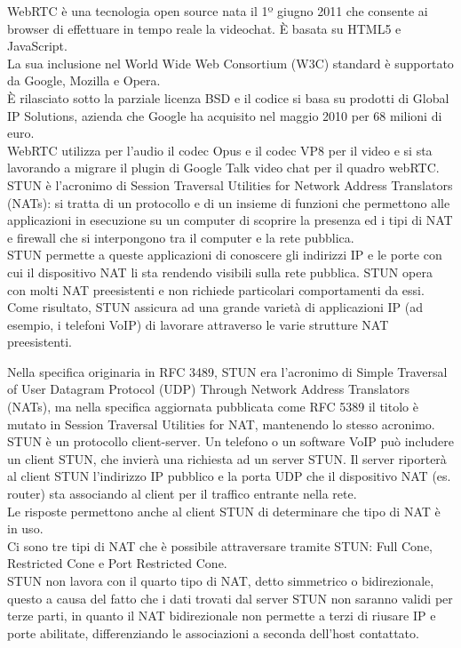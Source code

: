 ﻿\documentclass[11pt, a4paper, titlepage, block]{article}
\begin{document}
WebRTC è una tecnologia open source nata il 1º giugno 2011 che consente ai browser di effettuare in tempo reale la videochat. È basata su HTML5 e JavaScript.\\
La sua inclusione nel World Wide Web Consortium (W3C) standard è supportato da Google, Mozilla e Opera.\\
È rilasciato sotto la parziale licenza BSD e il codice si basa su prodotti di Global IP Solutions, azienda che Google ha acquisito nel maggio 2010 per 68 milioni di euro.\\
WebRTC utilizza per l'audio il codec Opus e il codec VP8 per il video e si sta lavorando a migrare il plugin di Google Talk video chat per il quadro webRTC.
\\
STUN è l'acronimo di Session Traversal Utilities for Network Address Translators (NATs): si tratta di un protocollo e di un insieme di funzioni che permettono alle applicazioni in esecuzione su un computer di scoprire la presenza ed i tipi di NAT e firewall che si interpongono tra il computer e la rete pubblica.\\
STUN permette a queste applicazioni di conoscere gli indirizzi IP e le porte con cui il dispositivo NAT li sta rendendo visibili sulla rete pubblica. STUN opera con molti NAT preesistenti e non richiede particolari comportamenti da essi.\\
Come risultato, STUN assicura ad una grande varietà di applicazioni IP (ad esempio, i telefoni VoIP) di lavorare attraverso le varie strutture NAT preesistenti.

Nella specifica originaria in RFC 3489, STUN era l'acronimo di Simple Traversal of User Datagram Protocol (UDP) Through Network Address Translators (NATs), ma nella specifica aggiornata pubblicata come RFC 5389 il titolo è mutato in Session Traversal Utilities for NAT, mantenendo lo stesso acronimo.\\

STUN è un protocollo client-server. Un telefono o un software VoIP può includere un client STUN, che invierà una richiesta ad un server STUN. Il server riporterà al client STUN l'indirizzo IP pubblico e la porta UDP che il dispositivo NAT (es. router) sta associando al client per il traffico entrante nella rete.\\
Le risposte permettono anche al client STUN di determinare che tipo di NAT è in uso.\\
Ci sono tre tipi di NAT che è possibile attraversare tramite STUN: Full Cone, Restricted Cone e Port Restricted Cone.\\
STUN non lavora con il quarto tipo di NAT, detto simmetrico o bidirezionale, questo a causa del fatto che i dati trovati dal server STUN non saranno validi per terze parti, in quanto il NAT bidirezionale non permette a terzi di riusare IP e porte abilitate, differenziando le associazioni a seconda dell'host contattato.\\
\end{document}
